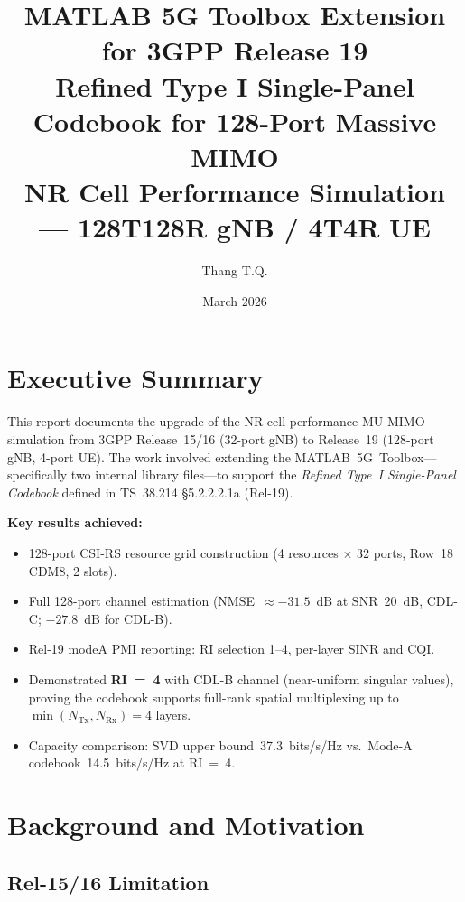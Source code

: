 \documentclass[11pt,a4paper]{article}
\title{
  \Large\textbf{MATLAB 5G Toolbox Extension for 3GPP Release 19}\\[0.4em]
  \large Refined Type I Single-Panel Codebook for 128-Port Massive MIMO\\[0.4em]
  \normalsize NR Cell Performance Simulation --- 128T128R gNB / 4T4R UE
}
\author{Thang T.Q.}
\date{March 2026}
\begin{document}
\maketitle
\tableofcontents
\newpage

\section{Executive Summary}

This report documents the upgrade of the NR cell-performance MU-MIMO simulation
from 3GPP Release~15/16 (32-port gNB) to Release~19 (128-port gNB, 4-port UE).
The work involved extending the MATLAB~5G~Toolbox---specifically two internal
library files---to support the \emph{Refined Type~I Single-Panel Codebook}
defined in TS~38.214 \S5.2.2.2.1a (Rel-19).

\medskip
\noindent\textbf{Key results achieved:}
\begin{itemize}
  \item 128-port CSI-RS resource grid construction (4 resources $\times$ 32 ports,
        Row~18 CDM8, 2 slots).
  \item Full 128-port channel estimation (NMSE~$\approx -31.5$~dB at SNR~20~dB,
        CDL-C; $-27.8$~dB for CDL-B).
  \item Rel-19 modeA PMI reporting: RI selection 1--4, per-layer SINR and CQI.
  \item Demonstrated \textbf{RI~=~4} with CDL-B channel (near-uniform singular
        values), proving the codebook supports full-rank spatial multiplexing
        up to $\min(N_\text{Tx},N_\text{Rx}) = 4$ layers.
  \item Capacity comparison: SVD upper bound~37.3~bits/s/Hz vs.\
        Mode-A codebook~14.5~bits/s/Hz at RI~=~4.
\end{itemize}

\section{Background and Motivation}

\subsection{Rel-15/16 Limitation}
\end{document}

